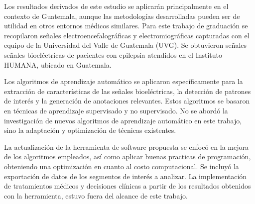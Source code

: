 




Los resultados derivados de este estudio se aplicarán principalmente en el contexto de Guatemala, aunque las metodologías desarrolladas pueden ser de utilidad en otros entornos médicos similares. Para este trabajo de graduación se recopilaron señales electroencefalográficas y electromiográficas capturadas con el equipo de la Universidad del Valle de Guatemala (UVG). Se obtuvieron señales señales bioeléctricas de pacientes con epilepsia atendidos en el Instituto HUMANA, ubicado en Guatemala. 

Los algoritmos de aprendizaje automático se aplicaron específicamente para la extracción de características de las señales bioeléctricas, la detección de patrones de interés y la generación de anotaciones relevantes. Estos algoritmos se basaron en técnicas de aprendizaje supervisado y no supervisado. No se abordó la investigación de nuevos algoritmos de aprendizaje automático en este trabajo, sino la adaptación y optimización de técnicas existentes.

La actualización de la herramienta de software propuesta se enfocó en la mejora de los algoritmos empleados, así como aplicar buenas practicas de programación, obteniendo una optimización en cuanto al costo computacional. Se incluyó la exportación de datos de los segmentos de interés a analizar. 
La implementación de tratamientos médicos y decisiones clínicas a partir de los resultados obtenidos con la herramienta, estuvo fuera del alcance de este trabajo.

